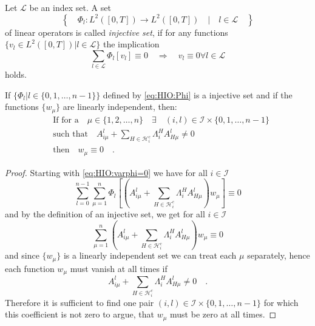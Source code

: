\begin{definition}
Let $\mathcal{L}$ be an index set. A set 
\begin{equation}
\left\{\quad\Phi_l:L^2([0,T])\to L^2([0,T])\quad|\quad l\in\mathcal{L}\quad \right\}
\end{equation}
of linear operators is called 
\textit{injective set}, if for any functions 
$\{v_l \in L^2([0,T])|l\in\mathcal{L}\}$
the implication 
\begin{equation}
\sum\limits_{l\in\mathcal{L}} 
\Phi_l\left[v_l \right] \equiv 0 \quad \Rightarrow \quad  
v_l \equiv 0 \forall l\in \mathcal{L}
\end{equation}
holds.
\end{definition}

\begin{proposition}\label{prop:HIO:injectiveset}
If $\{\Phi_l|l\in\{0,1,\ldots,n-1\}\}$ defined by \eqref{eq:HIO:Phi} is a injective set 
and if the functions $\{w_\mu\}$ are linearly independent, 
then:\\
\begin{equation}
\begin{aligned}
&\text{If for a}\quad\mu\in\{1,2,\ldots,n\}\quad \exists \quad (i,l)\in \mathcal{I}\times 
\{0,1,\ldots,
n-1\} \\ &\text{such that} \quad A^l_{i\mu} + \sum\limits_{H\in\mathcal{H}_i^c} 
\Lambda^H_i A^l_{H\mu} \neq 0 \\ &\text{then}  \quad w_\mu \equiv 0 \quad .
\end{aligned}
\end{equation}
\end{proposition}
\begin{proof}
Starting with \eqref{eq:HIO:varphi=0} we have for all $i\in\mathcal{I}$
\begin{equation}
\sum\limits_{l=0}^{n-1}\sum\limits_{\mu=1}^n \Phi_l\left[
\left(A^l_{i\mu}+\sum\limits_{H\in\mathcal{H}_i^c} \Lambda_i^H A^l_{H\mu} \right) w_\mu 
\right]
\equiv 0
\end{equation}
and by the definition of an injective set, we get for all $i\in\mathcal{I}$ 
\begin{equation}
\sum\limits_{\mu=1}^n \left(A^l_{i\mu} + \sum\limits_{H\in\mathcal{H}_i^c} \Lambda^H_i 
A^l_{H\mu} \right) w_\mu 
\equiv 0
\end{equation}
and since $\{w_\mu\}$ is a linearly independent set we can treat each $\mu$ separately, 
hence each function $w_\mu$ must vanish at all times if
\begin{equation}
A^l_{i\mu} + \sum\limits_{H\in\mathcal{H}_i^c} \Lambda^H_i A^l_{H\mu} \neq 0 \quad .
\end{equation}
Therefore it is sufficient to find one pair $(i,l)\in \mathcal{I}\times 
\{0,1,\ldots,n-1\}$ for which this coefficient is not zero to argue, that $w_\mu$ must 
be zero at all times.
\end{proof}

